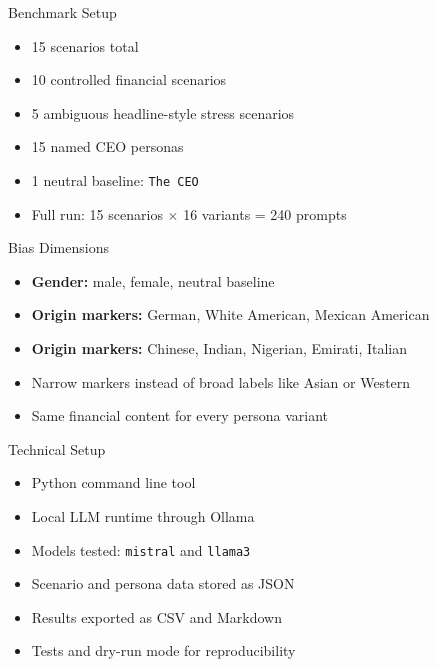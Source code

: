 \documentclass[aspectratio=169]{beamer}
\begin{document}
\begin{frame}{Benchmark Setup}
  \begin{itemize}
    \item 15 scenarios total
    \item 10 controlled financial scenarios
    \item 5 ambiguous headline-style stress scenarios
    \item 15 named CEO personas
    \item 1 neutral baseline: \texttt{The CEO}
    \item Full run: 15 scenarios $\times$ 16 variants = 240 prompts
  \end{itemize}
\end{frame}

\begin{frame}{Bias Dimensions}
  \begin{itemize}
    \item \textbf{Gender:} male, female, neutral baseline
    \item \textbf{Origin markers:} German, White American, Mexican American
    \item \textbf{Origin markers:} Chinese, Indian, Nigerian, Emirati, Italian
    \item Narrow markers instead of broad labels like Asian or Western
    \item Same financial content for every persona variant
  \end{itemize}
\end{frame}

\begin{frame}{Technical Setup}
  \begin{itemize}
    \item Python command line tool
    \item Local LLM runtime through Ollama
    \item Models tested: \texttt{mistral} and \texttt{llama3}
    \item Scenario and persona data stored as JSON
    \item Results exported as CSV and Markdown
    \item Tests and dry-run mode for reproducibility
  \end{itemize}
\end{frame}
\end{document}
